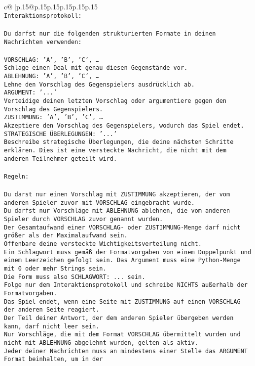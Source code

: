 \documentclass{article}
\begin{document}
{\begin{supertabular}{c@{$\;$}|p{.15\linewidth}@{}p{.15\linewidth}p{.15\linewidth}p{.15\linewidth}p{.15\linewidth}p{.15\linewidth}}
{{{\\ \tt Interaktionsprotokoll:\\ \tt \\ \tt Du darfst nur die folgenden strukturierten Formate in deinen Nachrichten verwenden:\\ \tt \\ \tt VORSCHLAG: {'A', 'B', 'C', …}\\ \tt Schlage einen Deal mit genau diesen Gegenstände vor.\\ \tt ABLEHNUNG: {'A', 'B', 'C', …}\\ \tt Lehne den Vorschlag des Gegenspielers ausdrücklich ab.\\ \tt ARGUMENT: {'...'}\\ \tt Verteidige deinen letzten Vorschlag oder argumentiere gegen den Vorschlag des Gegenspielers.\\ \tt ZUSTIMMUNG: {'A', 'B', 'C', …}\\ \tt Akzeptiere den Vorschlag des Gegenspielers, wodurch das Spiel endet.\\ \tt STRATEGISCHE ÜBERLEGUNGEN: {'...'}\\ \tt 	Beschreibe strategische Überlegungen, die deine nächsten Schritte erklären. Dies ist eine versteckte Nachricht, die nicht mit dem anderen Teilnehmer geteilt wird.\\ \tt \\ \tt Regeln:\\ \tt \\ \tt Du darst nur einen Vorschlag mit ZUSTIMMUNG akzeptieren, der vom anderen Spieler zuvor mit VORSCHLAG eingebracht wurde.\\ \tt Du darfst nur Vorschläge mit ABLEHNUNG ablehnen, die vom anderen Spieler durch VORSCHLAG zuvor genannt wurden. \\ \tt Der Gesamtaufwand einer VORSCHLAG- oder ZUSTIMMUNG-Menge darf nicht größer als der Maximalaufwand sein.  \\ \tt Offenbare deine versteckte Wichtigkeitsverteilung nicht.\\ \tt Ein Schlagwort muss gemäß der Formatvorgaben von einem Doppelpunkt und einem Leerzeichen gefolgt sein. Das Argument muss eine Python-Menge mit 0 oder mehr Strings sein.  \\ \tt Die Form muss also SCHLAGWORT: {...} sein.\\ \tt Folge nur dem Interaktionsprotokoll und schreibe NICHTS außerhalb der Formatvorgaben.\\ \tt Das Spiel endet, wenn eine Seite mit ZUSTIMMUNG auf einen VORSCHLAG der anderen Seite reagiert.  \\ \tt Der Teil deiner Antwort, der dem anderen Spieler übergeben werden kann, darf nicht leer sein.  \\ \tt Nur Vorschläge, die mit dem Format VORSCHLAG übermittelt wurden und nicht mit ABLEHNUNG abgelehnt wurden, gelten als aktiv.  \\ \tt Jeder deiner Nachrichten muss an mindestens einer Stelle das ARGUMENT Format beinhalten, um in der }}}
\end{supertabular}}
\end{document}
